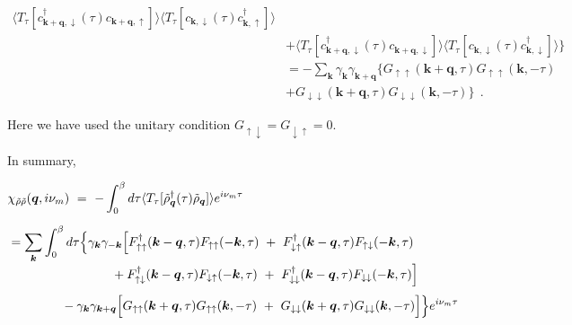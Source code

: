 \documentclass[a4j]{jsarticle}
\begin{document}
\begin{align}
	\langle T_{\tau} [
			c_{ \bm{k}+\bm{q} , \downarrow }^{\dagger} (\tau)
			c_{ \bm{k}+\bm{q} , \uparrow }
		] \rangle
	\langle T_{\tau} [
			c_{ \bm{k} , \downarrow } (\tau)
			c_{ \bm{k} , \uparrow }^{\dagger}
		] \rangle
	\nonumber \\[2mm] &+
	\langle T_{\tau} [
			c_{ \bm{k}+\bm{q} , \downarrow }^{\dagger} (\tau)
			c_{ \bm{k}+\bm{q} , \downarrow }
		] \rangle
	\langle T_{\tau} [
			c_{ \bm{k} , \downarrow } (\tau)
			c_{ \bm{k} , \downarrow }^{\dagger}
		] \rangle
	\Big\}
	\nonumber \\[3mm]
	 & =
	-
	\sum_{ \bm{k} }
	\gamma_{\bm{k}}
	\gamma_{\bm{k}+\bm{q}}
	\Big\{
	G_{\uparrow \uparrow}( \bm{k}+\bm{q} , \tau)
	G_{\uparrow \uparrow}( \bm{k} , - \tau)
	\nonumber \\[-1mm] &+
	G_{\downarrow \downarrow}( \bm{k}+\bm{q} , \tau)
	G_{\downarrow \downarrow}( \bm{k} , - \tau)
	\Big\}
	\ \ .
\end{align}

Here we have used the unitary condition $G_{\uparrow \downarrow} = G_{\downarrow \uparrow} = 0$.

In summary,

\begin{align}
	 &
	\chi_{\tilde{\rho} \tilde{\rho}}(\bm{q},i \nu_{m})
	\ = \
	-
	\int^{\beta}_{0} d \tau
	\langle T_{\tau}[ \tilde{\rho}_{\bm{q}}^{\dagger} (\tau) \tilde{\rho}_{\bm{q}} ] \rangle
	e^{i \nu_{m} \tau}
	\nonumber \\[2mm]
	 & =
	\sum_{ \bm{k} }
	\int^{\beta}_{0} d \tau
	\Big\{
	\gamma_{\bm{k}}
	\gamma_{-\bm{k}}
	\Big[
		F_{ \uparrow \uparrow }^{\dagger}( \bm{k} - \bm{q} , \tau )
		F_{ \uparrow \uparrow } ( - \bm{k} , \tau )
		\ + \
		F_{ \downarrow \uparrow }^{\dagger}( \bm{k} - \bm{q} , \tau )
		F_{ \uparrow \downarrow } ( - \bm{k} , \tau )
	\nonumber \\[-1mm] & \hspace{29mm} +
	F_{ \uparrow \downarrow }^{\dagger}( \bm{k} - \bm{q} , \tau )
	F_{ \downarrow \uparrow } ( - \bm{k} , \tau )
	\ + \
	F_{ \downarrow \downarrow }^{\dagger}( \bm{k} - \bm{q} , \tau )
	F_{ \downarrow \downarrow } ( - \bm{k} , \tau )
	\Big]
	\nonumber \\[1mm] & \hspace{15mm} -
	\gamma_{\bm{k}}
	\gamma_{\bm{k}+\bm{q}}
	\Big[
		G_{\uparrow \uparrow}( \bm{k}+\bm{q} , \tau)
		G_{\uparrow \uparrow}( \bm{k} , - \tau)
		\ + \
		G_{\downarrow \downarrow}( \bm{k}+\bm{q} , \tau)
		G_{\downarrow \downarrow}( \bm{k} , - \tau)
		\Big]
	\Big\}
	e^{i \nu_{m} \tau}
\end{align}
\end{document}
